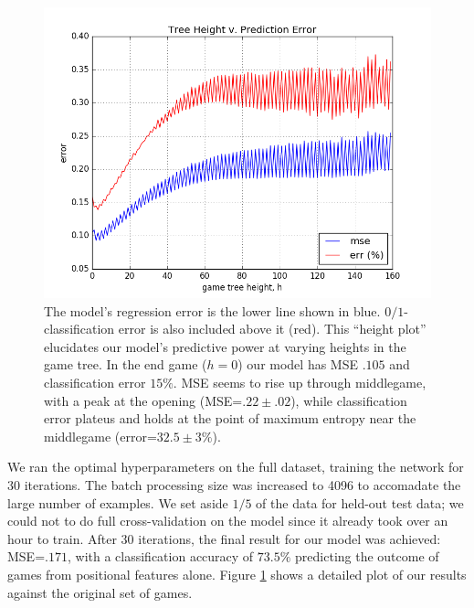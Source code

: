 \documentclass{article}
\begin{document}
\begin{figure}[ht]
\centering
\includegraphics[scale=.5]{assets/figure-hplot.png}
\caption{The model's regression error is the lower line shown in blue.  $0/1$-classification error is also included above it (red).  This ``height plot'' elucidates our model's predictive power at varying heights in the game tree.  In the end game ($h=0$) our model has MSE $.105$ and classification error $15\%$.  MSE seems to rise up through middlegame, with a peak at the opening (MSE=$.22\pm .02$), while classification error plateus and holds at the point of maximum entropy near the middlegame (error=$32.5\pm 3 \%$). \label{fig:hplot}}
\end{figure}

We ran the optimal hyperparameters on the full dataset, training the network for 30 iterations.  The batch processing size was increased to 4096 to accomadate the large number of examples.  We set aside $1/5$ of the data for held-out test data; we could not to do full cross-validation on the model since it already took over an hour to train.  After 30 iterations, the final result for our model was achieved: MSE=$.171$, with a classification accuracy of $73.5\%$ predicting the outcome of games from positional features alone.  Figure \ref{fig:hplot} shows a detailed plot of our results against the original set of games.
\end{document}
